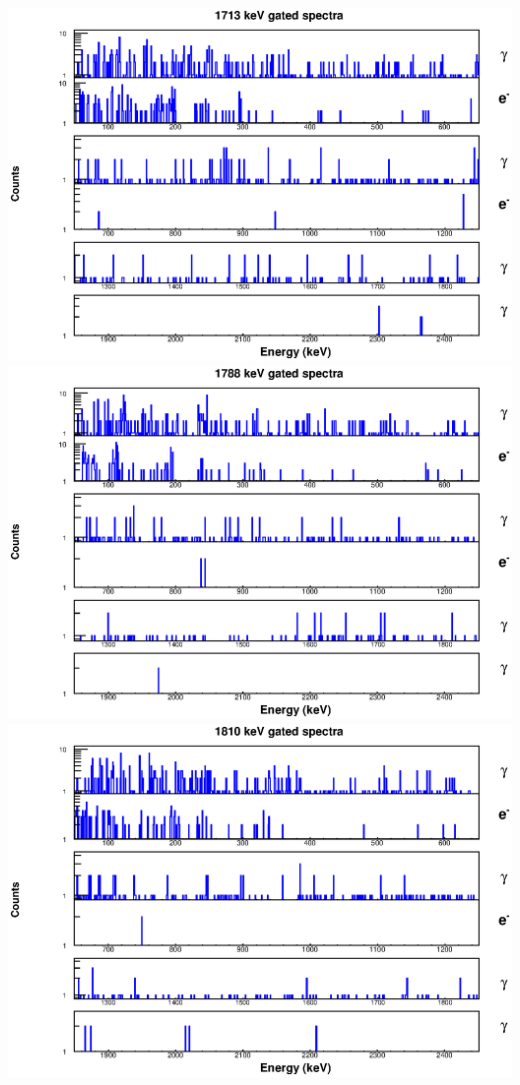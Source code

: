 \includegraphics[scale=0.8]{154Gd_Appendix/1713_combined.eps}
\includegraphics[scale=0.8]{154Gd_Appendix/1788_combined.eps}
\includegraphics[scale=0.8]{154Gd_Appendix/1810_combined.eps}
